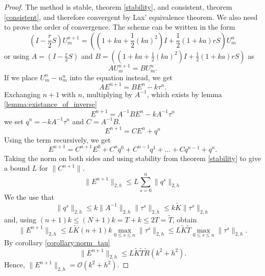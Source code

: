 \begin{proof}
    The method is stable, theorem \ref{stability}, and consistent, theorem \ref{consistent}, and therefore convergent by Lax' equivalence theorem. We also need to prove the order of convergence.
    The scheme can be written in the form
    $$\left(I - \frac{r}{2}S \right)U_{m}^{n+1} = \left( \left(1+ka+\frac{1}{2}(ka)^2\right)I + \frac{1}{2}\left(1+ka\right)rS\right)U_{m}^n$$
    or using $A = \left(I - \frac{r}{2}S \right)$ and $B = \left( \left(1+ka+\frac{1}{2}(ka)^2\right)I + \frac{1}{2}\left(1+ka\right)rS\right)$ as
    $$AU_{m}^{n+1} = BU_{m}^{n}.$$
    If we place $U_m^n - u_m^n$ into the equation instead, we get
    $$
    AE^{n+1} = BE^n - k\tau^n.
    $$
    Exchanging $n+1$ with $n$, multiplying by $A^{-1}$,
    which exists by lemma \ref{lemma:existance_of_inverse}
    $$E^{n+1} = A^{-1}BE^{n} -kA^{-1}\tau^n$$
    we set $q^{n}= -kA^{-1}\tau^n$ and $C=A^{-1}B$.
    $$E^{n+1} = CE^{n}+q^{n}$$
    Using the term recursively, we get
    $$
    E^{n+1} = C^{n+1}E^{0}+C^{n}q^0 + C^{n-1}q^1 + \dots + C q^{n-1} + q^{n}.
    $$
    Taking the norm on both sides and using stability from theorem \ref{stability} to give a bound $L$ for $\lVert C^{n+1} \lVert$.
    $$\lVert E^{n+1}\rVert_{2,h}  \leq L\sum_{s=0}^{n}\lVert q^s \rVert_{2,h}$$
    We the use that 
    $$\lVert q^s \rVert_{2,h} \leq k \lVert A^{-1} \rVert_{2,h} \lVert\tau^s \rVert_{2,h} \leq k \tilde{K} \lVert\tau^s \rVert_{2,h}$$
    and, using $(n+1)k\leq (N+1)k=T+k\le 2T = \tilde{T}$, obtain
    $$
    \lVert E^{n+1} \rVert_{2,h}
    \leq L \tilde{K}(n+1)k \max_{0\leq s \leq n} \lVert \tau^s\rVert_{2,h}
    \leq L \tilde{K}\tilde{T}\max_{0\leq s \leq n} \lVert \tau^s\rVert_{2,h}.
    $$
    By corollary \ref{corollary:norm_tau}
    $$
    \lVert E^{n+1} \rVert_{2, h} \leq L \tilde{K}\tilde{T}\tilde{R}(k^2+h^2).
    $$
  Hence, \( \lVert E^{n+1} \rVert_{2, h} = \mathcal{O}(k^2 + h^2)\).
\end{proof}

